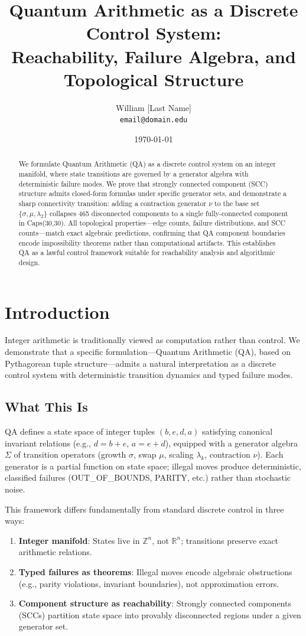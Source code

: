 \documentclass[11pt]{article}
\title{Quantum Arithmetic as a Discrete Control System: \\
Reachability, Failure Algebra, and Topological Structure}
\author{William [Last Name]\\
\texttt{email@domain.edu}}
\date{\today}
\theoremstyle{definition}
\begin{document}
\maketitle

\begin{abstract}
We formulate Quantum Arithmetic (QA) as a discrete control system on an integer manifold, where state transitions are governed by a generator algebra with deterministic failure modes. We prove that strongly connected component (SCC) structure admits closed-form formulas under specific generator sets, and demonstrate a sharp connectivity transition: adding a contraction generator $\nu$ to the base set $\{\sigma, \mu, \lambda_2\}$ collapses 465 disconnected components to a single fully-connected component in Caps(30,30). All topological properties—edge counts, failure distributions, and SCC counts—match exact algebraic predictions, confirming that QA component boundaries encode impossibility theorems rather than computational artifacts. This establishes QA as a lawful control framework suitable for reachability analysis and algorithmic design.
\end{abstract}

\section{Introduction}

Integer arithmetic is traditionally viewed as computation rather than control. We demonstrate that a specific formulation—Quantum Arithmetic (QA), based on Pythagorean tuple structure—admits a natural interpretation as a discrete control system with deterministic transition dynamics and typed failure modes.

\subsection{What This Is}

QA defines a state space of integer tuples $(b,e,d,a)$ satisfying canonical invariant relations (e.g., $d = b+e$, $a = e+d$), equipped with a generator algebra $\Sigma$ of transition operators (growth $\sigma$, swap $\mu$, scaling $\lambda_k$, contraction $\nu$). Each generator is a partial function on state space; illegal moves produce deterministic, classified failures (OUT\_OF\_BOUNDS, PARITY, etc.) rather than stochastic noise.

This framework differs fundamentally from standard discrete control in three ways:
\begin{enumerate}
\item \textbf{Integer manifold}: States live in $\mathbb{Z}^n$, not $\mathbb{R}^n$; transitions preserve exact arithmetic relations.
\item \textbf{Typed failures as theorems}: Illegal moves encode algebraic obstructions (e.g., parity violations, invariant boundaries), not approximation errors.
\item \textbf{Component structure as reachability}: Strongly connected components (SCCs) partition state space into provably disconnected regions under a given generator set.
\end{enumerate}
\end{document}

